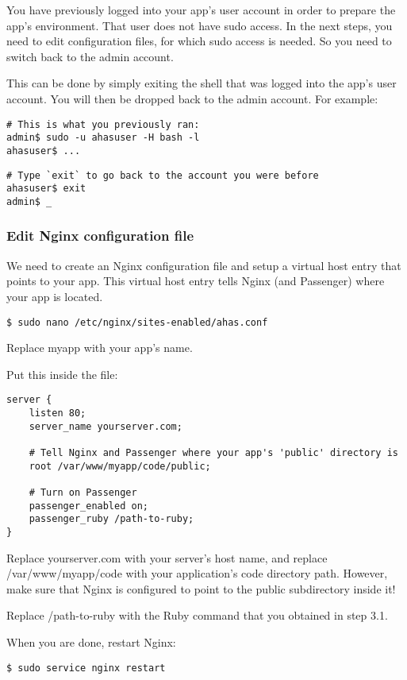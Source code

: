\documentclass[11pt]{article}
\begin{document}
You have previously logged into your app's user account in order to prepare the app's environment. That user does not have sudo access. In the next steps, you need to edit configuration files, for which sudo access is needed. So you need to switch back to the admin account.

This can be done by simply exiting the shell that was logged into the app's user account. You will then be dropped back to the admin account. For example:

\begin{verbatim}
# This is what you previously ran:
admin$ sudo -u ahasuser -H bash -l
ahasuser$ ...
\end{verbatim}

\begin{verbatim}
# Type `exit` to go back to the account you were before
ahasuser$ exit
admin$ _
\end{verbatim}

\subsubsection{Edit Nginx configuration file}
\label{sec:orgd8659b4}

We need to create an Nginx configuration file and setup a virtual host entry that points to your app. This virtual host entry tells Nginx (and Passenger) where your app is located.
\begin{verbatim}
$ sudo nano /etc/nginx/sites-enabled/ahas.conf
\end{verbatim}
Replace myapp with your app's name.

Put this inside the file:
\begin{verbatim}
server {
    listen 80;
    server_name yourserver.com;

    # Tell Nginx and Passenger where your app's 'public' directory is
    root /var/www/myapp/code/public;

    # Turn on Passenger
    passenger_enabled on;
    passenger_ruby /path-to-ruby;
}
\end{verbatim}
Replace yourserver.com with your server's host name, and replace /var/www/myapp/code with your application's code directory path. However, make sure that Nginx is configured to point to the public subdirectory inside it!

Replace /path-to-ruby with the Ruby command that you obtained in step 3.1.

When you are done, restart Nginx:

\begin{verbatim}
$ sudo service nginx restart
\end{verbatim}
\end{document}

